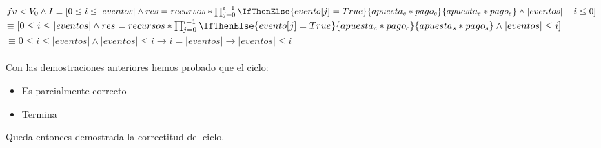 \documentclass[10pt,a4paper]{article}
\begin{document}
$fv<V_0 \land I \equiv [0 \leq i \leq |eventos| \land res = recursos *\prod_{j=0}^{i-1}\IfThenElse{evento[j]=True}{apuesta_c*pago_c}{apuesta_s*pago_s} \land |eventos| - i \leq 0]$\\

$\equiv [0 \leq i \leq |eventos| \land res = recursos *\prod_{j=0}^{i-1}\IfThenElse{evento[j]=True}{apuesta_c*pago_c}{apuesta_s*pago_s} \land |eventos| \leq i]$
\\

$\equiv 0 \leq i \leq |eventos| \land  |eventos| \leq i \longrightarrow i = |eventos| \longrightarrow |eventos| \leq i$\\
\\

Con las demostraciones anteriores hemos probado que el ciclo: 
\begin{itemize}
    \item Es parcialmente correcto
    \item Termina
\end{itemize}
Queda entonces demostrada la correctitud del ciclo.
\end{document}
